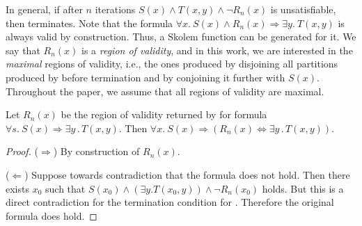 In general, if after $n$ iterations $S(x) \land T(x,y) \land \neg R_n(x)$ is unsatisfiable,
then \aeval terminates.
Note that the formula $\forall x.~ S(x) \land R_n(x) \Rightarrow \exists y .~T(x,y)$ is always valid by construction.
Thus, a Skolem function can be generated for it.
%
We say that $R_n(x)$ is a \emph{region of validity}, and in this work, we are interested in the \emph{maximal} regions of validity, i.e., the ones produced by disjoining all partitions produced by \aeval before termination and by conjoining it further with $S(x)$.
Throughout the paper, we assume that all regions of validity are maximal.



\begin{lemma}\label{lem:aeval}
  Let $R_n(x)$ be the region of validity returned by \aeval for  formula $\forall
  s.~ S(x) \Rightarrow \exists y\,.\,T(x,y)$. Then
$  \forall x.~ S(x) \Rightarrow (R_n(x) \Leftrightarrow \exists y\,.\,T(x,y))$.
\end{lemma}
\begin{proof}
  ($\Rightarrow$) By construction of $R_n(x)$.

  ($\Leftarrow$) Suppose towards contradiction that the formula does
  not hold. Then there exists $x_0$ such that $S(x_0) \land (\exists
  y. T(x_0, y)) \land \neg R_n(x_0)$ holds. But this is a direct
  contradiction for the termination condition for \aeval. Therefore
  the original formula does hold.
\end{proof}

